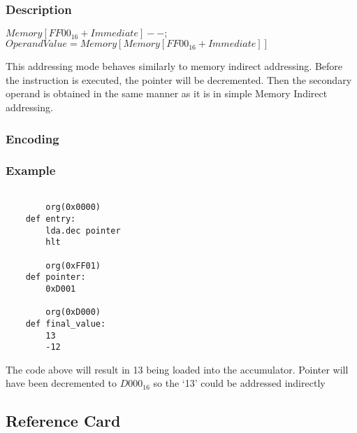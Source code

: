 \subsubsection{Description}
$Memory[FF00_{16} + Immediate]--;$\\
$OperandValue = Memory[Memory[FF00_{16} + Immediate]]$
\par This addressing mode behaves similarly to memory indirect addressing.
Before the instruction is executed, the pointer will be decremented.
Then the secondary operand is obtained in the same manner as it is in simple Memory Indirect addressing.

\subsubsection{Encoding}

\subsubsection{Example}
\begin{verbatim}

        org(0x0000)
    def entry:
        lda.dec pointer
        hlt

        org(0xFF01)
    def pointer:
        0xD001

        org(0xD000)
    def final_value:
        13
        -12

\end{verbatim}
The code above will result in 13 being loaded into the accumulator.
Pointer will have been decremented to $D000_{16}$ so the `13' could be addressed indirectly
\pagebreak

\subsection{Reference Card}\label{subsec:reference-card}